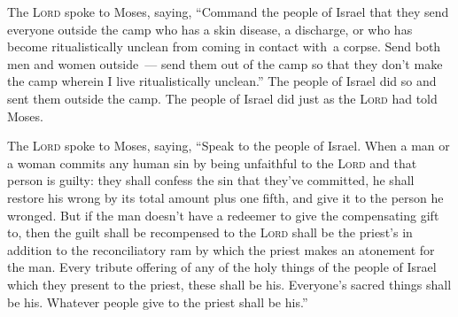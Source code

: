
\begin{inparaenum}
   The \textsc{Lord} spoke to Moses, saying,%
   ``Command the people of Israel that they send everyone outside the camp who has a skin disease, a discharge, or who has become ritualistically unclean from coming in contact with\understood\ a corpse.%
   Send both men and women outside~--- send them out of the camp so that they don't make the camp wherein I live ritualistically unclean.''%
   The people of Israel did so and sent them outside the camp. The people of Israel did just as the \textsc{Lord} had told Moses.%
  
   The \textsc{Lord} spoke to Moses, saying,%
   ``Speak to the people of Israel. When a man or a woman commits any human sin by being unfaithful to the \textsc{Lord} and that person is guilty:%
   they shall confess the sin that they've committed, he shall restore his wrong by its total amount plus one fifth, and give it to the person he wronged.%
   But if the man doesn't have a redeemer to give the compensating gift to, then the guilt shall be recompensed to the \textsc{Lord} shall be the priest's in addition to the reconciliatory ram by which the priest makes an atonement for the man.%
   Every tribute offering of any of the holy things of the people of Israel which they present to the priest, these shall be his.%
   Everyone's sacred things shall be his. Whatever people give to the priest shall be his.''%
  

\end{inparaenum}
